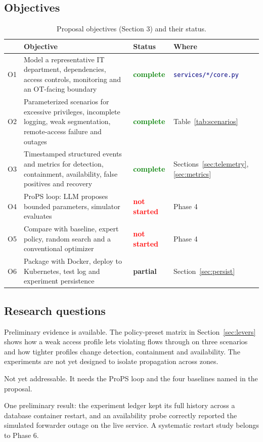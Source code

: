 \documentclass[11pt]{article}
\newcommand{\file}[1]{\textcolor{navy}{\texttt{\small #1}}}
\newcommand{\done}{\textcolor{green}{\textbf{complete}}}
\newcommand{\stpartial}{\textcolor{amber}{\textbf{partial}}}
\newcommand{\todo}{\textcolor{red}{\textbf{not started}}}
\begin{document}
\subsection{Objectives}
\begin{table}[h]
\centering
\caption{Proposal objectives (Section 3) and their status.}
\label{tab:objectives}
\small
\begin{tabular}{>{\RaggedRight\arraybackslash}p{0.6cm} >{\RaggedRight\arraybackslash}p{7.4cm} p{1.9cm} >{\RaggedRight\arraybackslash}p{4.0cm}}
\toprule
& \textbf{Objective} & \textbf{Status} & \textbf{Where}\\
\midrule
O1 & Model a representative IT department, dependencies, access controls, monitoring and an OT-facing boundary & \done & \file{services/*/core.py}\\
O2 & Parameterized scenarios for excessive privileges, incomplete logging, weak segmentation, remote-access failure and outages & \done & Table~\ref{tab:scenarios}\\
O3 & Timestamped structured events and metrics for detection, containment, availability, false positives and recovery & \done & Sections~\ref{sec:telemetry}, \ref{sec:metrics}\\
O4 & ProPS loop: LLM proposes bounded parameters, simulator evaluates & \todo & Phase 4\\
O5 & Compare with baseline, expert policy, random search and a conventional optimizer & \todo & Phase 4\\
O6 & Package with Docker, deploy to Kubernetes, test log and experiment persistence & \stpartial & Section~\ref{sec:persist}\\
\bottomrule
\end{tabular}
\end{table}

\subsection{Research questions}
\begin{description}[leftmargin=1.2em,style=nextline]
\item[RQ1 (risk propagation)] Preliminary evidence is available. The policy-preset
matrix in Section~\ref{sec:levers} shows how a weak access profile lets violating
flows through on three scenarios and how tighter profiles change detection,
containment and availability. The experiments are not yet designed to isolate
propagation across zones.
\item[RQ2 (policy optimization)] Not yet addressable. It needs the ProPS loop and
the four baselines named in the proposal.
\item[RQ3 (deployment resilience)] One preliminary result: the experiment ledger
kept its full history across a database container restart, and an availability
probe correctly reported the simulated forwarder outage on the live service. A
systematic restart study belongs to Phase 6.
\end{description}
\end{document}
